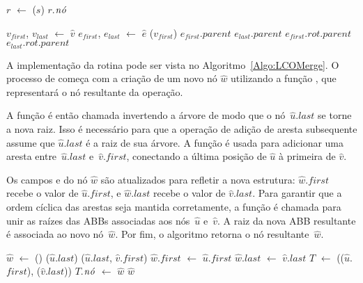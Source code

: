 \begin{algorithm}[htb]
\caption{\LCOFindNode($s$)}
\label{Algo:LCOFindNode}
\begin{algorithmic}[1]
\State $r$ $\gets$ \treapGetRoot($s$)
\State \Return $r$.$\mathit{n\acute{o}}$
\end{algorithmic}
\end{algorithm}




\begin{algorithm}[htb]
\caption{\LCOFindSubNode($\hat v$, $\hat e$)}
\label{Algo:LCOFindSubNode}
\begin{algorithmic}[1]
\State $v_{first}$, $v_{last}$ $\gets$ $\hat v$
\State $e_{first}$, $e_{last}$ $\gets$ $\hat e$
\State \linkcutEvert($v_{first}$)
\State \Return $e_{first}$.$parent$
\EndIf
\State \Return $e_{last}$.$parent$
\Else
{}
\State \Return $e_{first}.rot.parent$
\Else
\State \Return $e_{last}.rot.parent$
\EndIf
\EndIf
\end{algorithmic}
\end{algorithm}


A implementação da rotina \LCOMerge pode ser vista no Algoritmo~\ref{Algo:LCOMerge}.
O processo de \LCOMerge{} começa com a criação de um novo nó $\hat w$ utilizando a função \LCOMakeNode, que representará o nó resultante da operação.

A função \linkcutEvert{} é então chamada invertendo a árvore de modo que o nó~$\hat u$.$last$ se torne a nova raiz.
Isso é necessário para que a operação \linkcutAddEdge de adição de aresta subsequente assume que $\hat u$.$last$ é a raiz de sua árvore.
A função \linkcutAddEdge é usada para adicionar uma aresta entre~$\hat u$.$last$ e~$\hat v$.$first$, conectando a última posição de $\hat u$ à primeira de $\hat v$.

Os campos  e  do nó $\hat w$ são atualizados para refletir a nova estrutura: $\hat w$.$first$ recebe o valor de $\hat u$.$first$, e $\hat w$.$last$ recebe o valor de $\hat v$.$last$. Para garantir que a ordem cíclica das arestas seja mantida corretamente, a função \treapJoin{} é chamada para unir as raízes das ABBs associadas aos nós~$\hat u$ e~$\hat v$. A raiz da nova ABB resultante é associada ao novo nó~$\hat w$.
Por fim, o algoritmo retorna o nó resultante~$\hat w$.

\begin{algorithm}[htb]
\caption{\LCOMerge($\hat u$, $\hat v$)}
\label{Algo:LCOMerge}
\begin{algorithmic}[1]
\State $\hat w$ $\gets$ \LCOMakeNode()
\State \linkcutEvert($\hat u$.$last$)
\State \linkcutAddEdge($\hat u$.$last$, $\hat v$.$first$)
\State $\hat w$.$first$  $\gets$ $\hat u$.$first$
\State $\hat w$.$last$  $\gets$ $\hat v$.$last$
\State $T$ $\gets$ \treapJoin(\treapGetRoot($\hat u$.$first$), \treapGetRoot($\hat v$.$last$))
\State $T$.$\mathit{n\acute{o}}$ $\gets$ $\hat w$
\State \Return $\hat w$
\end{algorithmic}
\end{algorithm}

